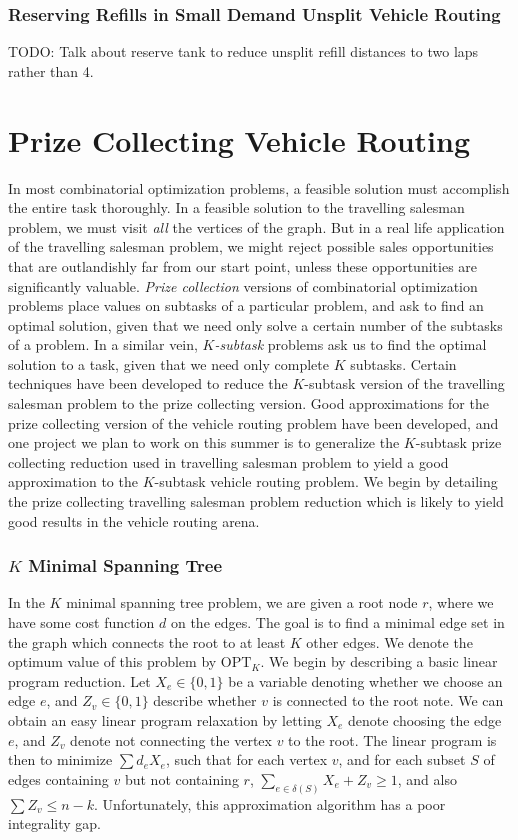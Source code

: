 \documentclass{article}
\theoremstyle{plain}
\theoremstyle{plain}
\begin{document}
\section{Reserving Refills in Small Demand Unsplit Vehicle Routing}

TODO: Talk about reserve tank to reduce unsplit refill distances to two laps rather than 4.

\part{Prize Collecting Vehicle Routing}

In most combinatorial optimization problems, a feasible solution must accomplish the entire task thoroughly. In a feasible solution to the travelling salesman problem, we must visit {\it all} the vertices of the graph. But in a real life application of the travelling salesman problem, we might reject possible sales opportunities that are outlandishly far from our start point, unless these opportunities are significantly valuable. {\it Prize collection} versions of combinatorial optimization problems place values on subtasks of a particular problem, and ask to find an optimal solution, given that we need only solve a certain number of the subtasks of a problem. In a similar vein, {\it $K$-subtask} problems ask us to find the optimal solution to a task, given that we need only complete $K$ subtasks. Certain techniques have been developed to reduce the $K$-subtask version of the travelling salesman problem to the prize collecting version. Good approximations for the prize collecting version of the vehicle routing problem have been developed, and one project we plan to work on this summer is to generalize the $K$-subtask prize collecting reduction used in travelling salesman problem to yield a good approximation to the $K$-subtask vehicle routing problem. We begin by detailing the prize collecting travelling salesman problem reduction which is likely to yield good results in the vehicle routing arena.

\section{$K$ Minimal Spanning Tree}

In the $K$ minimal spanning tree problem, we are given a root node $r$, where we have some cost function $d$ on the edges. The goal is to find a minimal edge set in the graph which connects the root to at least $K$ other edges. We denote the optimum value of this problem by $\text{OPT}_K$. We begin by describing a basic linear program reduction. Let $X_e \in \{ 0, 1 \}$ be a variable denoting whether we choose an edge $e$, and $Z_v \in \{ 0, 1 \}$ describe whether $v$ is connected to the root note. We can obtain an easy linear program relaxation by letting $X_e$ denote choosing the edge $e$, and $Z_v$ denote not connecting the vertex $v$ to the root. The linear program is then to minimize $\sum d_eX_e$, such that for each vertex $v$, and for each subset $S$ of edges containing $v$ but not containing $r$, $\sum_{e \in \delta(S)} X_e + Z_v \geq 1$, and also $\sum Z_v \leq n - k$. Unfortunately, this approximation algorithm has a poor integrality gap.
\end{document}
